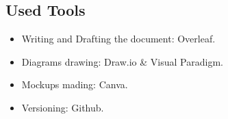 \documentclass[12pt]{article}
\numberwithin{figure}{section}
\numberwithin{table}{section}
\begin{document}
\subsection{Used Tools}
    \begin{itemize}
        \item Writing and Drafting the document: Overleaf.
        \item Diagrams drawing: Draw.io \& Visual Paradigm.
        \item Mockups mading: Canva.
        \item Versioning: Github.
    \end{itemize}

\listoffigures
\listoftables
\end{document}
